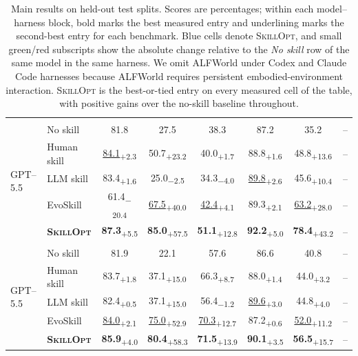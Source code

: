 \documentclass{llmxive}
\providecommand{\ourmethod}{\textsc{SkillOpt}\xspace}
\providecommand{\na}{--}
\providecommand{\dvalp}[2]{\hphantom{\textsubscript{+#2}}#1\textsubscript{+#2}}
\providecommand{\dvaln}[2]{\hphantom{\textsubscript{$-$#2}}#1\textsubscript{$-$#2}}
\providecommand{\harnessrow}[1]{\rowcolor{black!7}\multicolumn{8}{l}{\textbf{#1}}}
\providecommand{\methodcell}[1]{\cellcolor{blue!8}#1}
\begin{document}
\begin{table}[!htbp]
\begin{tabular}{l l c c c c c c}
\harnessrow{Codex harness} \\
\multirow{5}{*}{GPT--5.5} & No skill & 81.8 & 27.5 & 38.3 & 87.2 & 35.2 & \na \\
 & Human skill & \dvalp{\underline{84.1}}{2.3} & \dvalp{50.7}{23.2} & \dvalp{40.0}{1.7} & \dvalp{88.8}{1.6} & \dvalp{48.8}{13.6} & \na \\
 & LLM skill & \dvalp{83.4}{1.6} & \dvaln{25.0}{2.5} & \dvaln{34.3}{4.0} & \dvalp{\underline{89.8}}{2.6} & \dvalp{45.6}{10.4} & \na \\
 & EvoSkill & \dvaln{61.4}{20.4} & \dvalp{\underline{67.5}}{40.0} & \dvalp{\underline{42.4}}{4.1} & \dvalp{89.3}{2.1} & \dvalp{\underline{63.2}}{28.0} & \na \\
 & \methodcell{\textbf{\ourmethod{}}} & \methodcell{\dvalp{\textbf{87.3}}{5.5}} & \methodcell{\dvalp{\textbf{85.0}}{57.5}} & \methodcell{\dvalp{\textbf{51.1}}{12.8}} & \methodcell{\dvalp{\textbf{92.2}}{5.0}} & \methodcell{\dvalp{\textbf{78.4}}{43.2}} & \methodcell{\na} \\
\midrule
\harnessrow{Claude Code harness} \\
\multirow{5}{*}{GPT--5.5} & No skill & 81.9 & 22.1 & 57.6 & 86.6 & 40.8 & \na \\
 & Human skill & \dvalp{83.7}{1.8} & \dvalp{37.1}{15.0} & \dvalp{66.3}{8.7} & \dvalp{88.0}{1.4} & \dvalp{44.0}{3.2} & \na \\
 & LLM skill & \dvalp{82.4}{0.5} & \dvalp{37.1}{15.0} & \dvaln{56.4}{1.2} & \dvalp{\underline{89.6}}{3.0} & \dvalp{44.8}{4.0} & \na \\
 & EvoSkill & \dvalp{\underline{84.0}}{2.1} & \dvalp{\underline{75.0}}{52.9} & \dvalp{\underline{70.3}}{12.7} & \dvalp{87.2}{0.6} & \dvalp{\underline{52.0}}{11.2} & \na \\
 & \methodcell{\textbf{\ourmethod{}}} & \methodcell{\dvalp{\textbf{85.9}}{4.0}} & \methodcell{\dvalp{\textbf{80.4}}{58.3}} & \methodcell{\dvalp{\textbf{71.5}}{13.9}} & \methodcell{\dvalp{\textbf{90.1}}{3.5}} & \methodcell{\dvalp{\textbf{56.5}}{15.7}} & \methodcell{\na} \\
\bottomrule
\end{tabular}
\caption{Main results on held-out test splits. Scores are percentages; within each model--harness block, bold marks the best measured entry and underlining marks the second-best entry for each benchmark. Blue cells denote \ourmethod{}, and small green/red subscripts show the absolute change relative to the \emph{No skill} row of the same model in the same harness. We omit ALFWorld under Codex and Claude Code harnesses because ALFWorld requires persistent embodied-environment interaction. \ourmethod{} is the best-or-tied entry on every measured cell of the table, with positive gains over the no-skill baseline throughout.}
\label{tab:main_results_by_harness}
\end{table}
\end{document}
